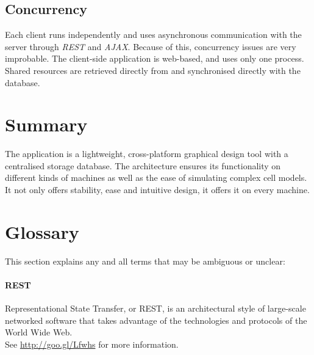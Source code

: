 \documentclass{report}
\begin{document}
		\subsection{Concurrency}
			Each client runs independently and uses asynchronous communication with the server through \emph{REST} and \emph{AJAX}. Because of this, concurrency issues are very improbable. The client-side application is web-based, and uses only one process. Shared resources are retrieved directly from and synchronised directly with the database.\\
			
	\clearpage
	\section{Summary}
		The application is a lightweight, cross-platform graphical design tool with a centralised storage database. The architecture ensures its functionality on different kinds of machines as well as the ease of simulating complex cell models. It not only offers stability, ease and intuitive design, it offers it on every machine.
	\section{Glossary}
		This section explains any and all terms that may be ambiguous or unclear:
		\paragraph{REST} 
			Representational State Transfer, or REST, is an architectural style of large-scale networked software that takes advantage of the technologies and protocols of the World Wide Web. \\
See \href{http://goo.gl/Lfwhs}{http://goo.gl/Lfwhs} for more information.
\end{document}
